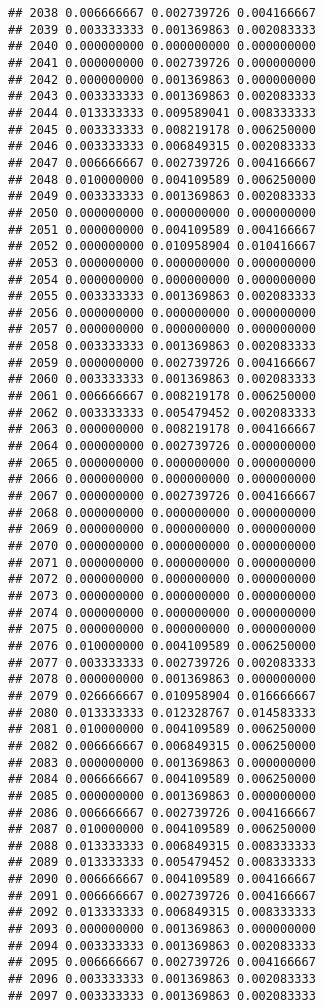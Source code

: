 \documentclass[
]{article}
\begin{document}
\begin{verbatim}
## 2038 0.006666667 0.002739726 0.004166667
## 2039 0.003333333 0.001369863 0.002083333
## 2040 0.000000000 0.000000000 0.000000000
## 2041 0.000000000 0.002739726 0.000000000
## 2042 0.000000000 0.001369863 0.000000000
## 2043 0.003333333 0.001369863 0.002083333
## 2044 0.013333333 0.009589041 0.008333333
## 2045 0.003333333 0.008219178 0.006250000
## 2046 0.003333333 0.006849315 0.002083333
## 2047 0.006666667 0.002739726 0.004166667
## 2048 0.010000000 0.004109589 0.006250000
## 2049 0.003333333 0.001369863 0.002083333
## 2050 0.000000000 0.000000000 0.000000000
## 2051 0.000000000 0.004109589 0.004166667
## 2052 0.000000000 0.010958904 0.010416667
## 2053 0.000000000 0.000000000 0.000000000
## 2054 0.000000000 0.000000000 0.000000000
## 2055 0.003333333 0.001369863 0.002083333
## 2056 0.000000000 0.000000000 0.000000000
## 2057 0.000000000 0.000000000 0.000000000
## 2058 0.003333333 0.001369863 0.002083333
## 2059 0.000000000 0.002739726 0.004166667
## 2060 0.003333333 0.001369863 0.002083333
## 2061 0.006666667 0.008219178 0.006250000
## 2062 0.003333333 0.005479452 0.002083333
## 2063 0.000000000 0.008219178 0.004166667
## 2064 0.000000000 0.002739726 0.000000000
## 2065 0.000000000 0.000000000 0.000000000
## 2066 0.000000000 0.000000000 0.000000000
## 2067 0.000000000 0.002739726 0.004166667
## 2068 0.000000000 0.000000000 0.000000000
## 2069 0.000000000 0.000000000 0.000000000
## 2070 0.000000000 0.000000000 0.000000000
## 2071 0.000000000 0.000000000 0.000000000
## 2072 0.000000000 0.000000000 0.000000000
## 2073 0.000000000 0.000000000 0.000000000
## 2074 0.000000000 0.000000000 0.000000000
## 2075 0.000000000 0.000000000 0.000000000
## 2076 0.010000000 0.004109589 0.006250000
## 2077 0.003333333 0.002739726 0.002083333
## 2078 0.000000000 0.001369863 0.000000000
## 2079 0.026666667 0.010958904 0.016666667
## 2080 0.013333333 0.012328767 0.014583333
## 2081 0.010000000 0.004109589 0.006250000
## 2082 0.006666667 0.006849315 0.006250000
## 2083 0.000000000 0.001369863 0.000000000
## 2084 0.006666667 0.004109589 0.006250000
## 2085 0.000000000 0.001369863 0.000000000
## 2086 0.006666667 0.002739726 0.004166667
## 2087 0.010000000 0.004109589 0.006250000
## 2088 0.013333333 0.006849315 0.008333333
## 2089 0.013333333 0.005479452 0.008333333
## 2090 0.006666667 0.004109589 0.004166667
## 2091 0.006666667 0.002739726 0.004166667
## 2092 0.013333333 0.006849315 0.008333333
## 2093 0.000000000 0.001369863 0.000000000
## 2094 0.003333333 0.001369863 0.002083333
## 2095 0.006666667 0.002739726 0.004166667
## 2096 0.003333333 0.001369863 0.002083333
## 2097 0.003333333 0.001369863 0.002083333

\end{verbatim}
\end{document}

